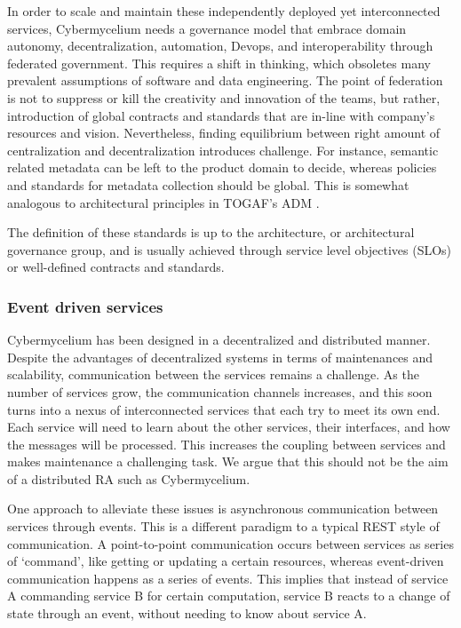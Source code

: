 \documentclass[review]{elsarticle}
\begin{document}
In order to scale and maintain these independently deployed yet interconnected services, Cybermycelium needs a governance model that embrace domain autonomy, decentralization, automation, Devops, and interoperability through federated government. This requires a shift in thinking, which obsoletes many prevalent assumptions of software and data engineering. The point of federation is not to suppress or kill the creativity and innovation of the teams, but rather, introduction of global contracts and standards that are in-line with company's resources and vision. Nevertheless, finding equilibrium between right amount of centralization and decentralization introduces challenge. For instance, semantic related metadata can be left to the product domain to decide, whereas policies and standards for metadata collection should be global. This is somewhat analogous to architectural principles in TOGAF's ADM \cite{josey2016togaf}.

The definition of these standards is up to the architecture, or architectural governance group, and is usually achieved through service level objectives (SLOs) or well-defined contracts and standards.

\subsubsection{Event driven services}

Cybermycelium has been designed in a decentralized and distributed manner. Despite the advantages of decentralized systems in terms of maintenances and scalability, communication between the services remains a challenge. As the number of services grow, the communication channels increases, and this soon turns into a nexus of interconnected services that each try to meet its own end. Each service will need to learn about the other services, their interfaces, and how the messages will be processed. This increases the coupling between services and makes maintenance a challenging task. We argue that this should not be the aim of a distributed RA such as Cybermycelium.

One approach to alleviate these issues is asynchronous communication between services through events. This is a different paradigm to a typical REST style of communication. A point-to-point communication occurs between services as series of `command', like getting or updating a certain resources, whereas event-driven communication happens as a series of events. This implies that instead of service A commanding service B for certain computation, service B reacts to a change of state through an event, without needing to know about service A.
\end{document}
